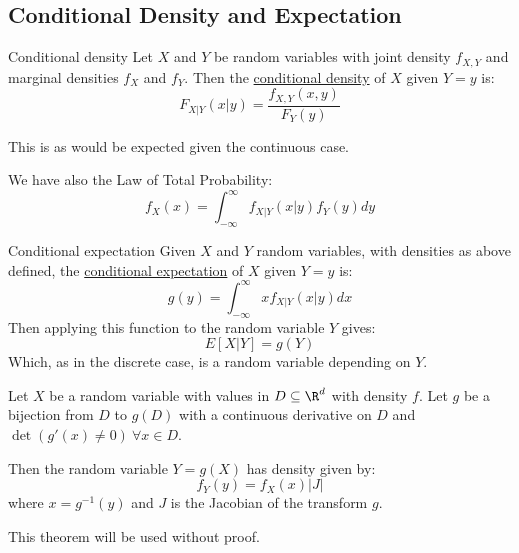 \documentclass[../Main.tex]{subfiles}
\begin{document}
\subsection{Conditional Density and Expectation}
\begin{definition}{Conditional density}
    Let $X$ and $Y$ be random variables with joint density $f_{X, Y}$ and marginal densities $f_X$ and $f_Y$. Then the \underline{conditional density} of $X$ given $Y = y$ is:
    \begin{equation*}
        F_{X | Y}(x | y) = \frac{f_{X, Y}(x, y)}{F_Y(y)}
    \end{equation*}
\end{definition}
This is as would be expected given the continuous case.\par
We have also the Law of Total Probability:
\begin{equation*}
    f_X(x) = \int_{-\infty}^\infty f_{X | Y}(x | y) f_Y(y) dy
\end{equation*}
\begin{definition}{Conditional expectation}
    Given $X$ and $Y$ random variables, with densities as above defined, the \underline{conditional expectation} of $X$ given $Y = y$ is:
    \begin{equation*}
        g(y) = \int_{-\infty}^\infty xf_{X | Y} (x | y) dx
    \end{equation*}
    Then applying this function to the random variable $Y$ gives:
    \begin{equation*}
        E[X | Y] = g(Y)
    \end{equation*}
    Which, as in the discrete case, is a random variable depending on $Y$.
\end{definition}
\begin{theorem}
    Let $X$ be a random variable with values in $D \subseteq \R^d$ with density $f$. Let $g$ be a bijection from $D$ to $g(D)$ with a continuous derivative on $D$ and $\det{(g'(x) \neq 0)}~\forall x \in D$.\par
    Then the random variable $Y = g(X)$ has density given by:
    \begin{equation*}
        f_Y(y) = f_X(x) |J|
    \end{equation*}
    where $x = g^{-1}(y)$ and $J$ is the Jacobian of the transform $g$.
\end{theorem}
This theorem will be used without proof.
\end{document}
